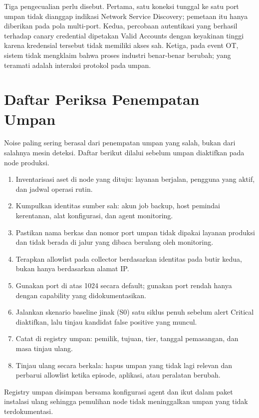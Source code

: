 \documentclass[12pt,a4paper]{article}
\begin{document}
Tiga pengecualian perlu disebut. Pertama, satu koneksi tunggal ke satu port umpan tidak dianggap indikasi Network Service Discovery; pemetaan itu hanya diberikan pada pola multi-port. Kedua, percobaan autentikasi yang berhasil terhadap canary credential dipetakan Valid Accounts dengan keyakinan tinggi karena kredensial tersebut tidak memiliki akses sah. Ketiga, pada event OT, sistem tidak mengklaim bahwa proses industri benar-benar berubah; yang teramati adalah interaksi protokol pada umpan.

\section{Daftar Periksa Penempatan Umpan}
\label{app:checklist}

Noise paling sering berasal dari penempatan umpan yang salah, bukan dari salahnya mesin deteksi. Daftar berikut dilalui sebelum umpan diaktifkan pada node produksi.

\begin{enumerate}[leftmargin=1.2cm,itemsep=2pt,topsep=2pt]
  \item Inventarisasi aset di node yang dituju: layanan berjalan, pengguna yang aktif, dan jadwal operasi rutin.
  \item Kumpulkan identitas sumber sah: akun job backup, host pemindai kerentanan, alat konfigurasi, dan agent monitoring.
  \item Pastikan nama berkas dan nomor port umpan tidak dipakai layanan produksi dan tidak berada di jalur yang dibaca berulang oleh monitoring.
  \item Terapkan allowlist pada collector berdasarkan identitas pada butir kedua, bukan hanya berdasarkan alamat IP.
  \item Gunakan port di atas 1024 secara default; gunakan port rendah hanya dengan capability yang didokumentasikan.
  \item Jalankan skenario baseline jinak (S0) satu siklus penuh sebelum alert Critical diaktifkan, lalu tinjau kandidat false positive yang muncul.
  \item Catat di registry umpan: pemilik, tujuan, tier, tanggal pemasangan, dan masa tinjau ulang.
  \item Tinjau ulang secara berkala: hapus umpan yang tidak lagi relevan dan perbarui allowlist ketika episode, aplikasi, atau peralatan berubah.
\end{enumerate}

Registry umpan disimpan bersama konfigurasi agent dan ikut dalam paket instalasi ulang sehingga pemulihan node tidak meninggalkan umpan yang tidak terdokumentasi.
\end{document}
